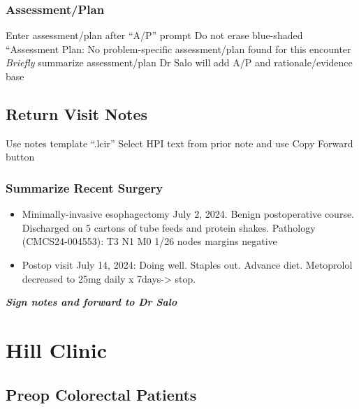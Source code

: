 \documentclass[
  letterpaper,
]{scrbook}
\providecommand{\tightlist}{%
  \setlength{\itemsep}{0pt}\setlength{\parskip}{0pt}}
\begin{document}
\subsection{Assessment/Plan}\label{assessmentplan}

Enter assessment/plan after ``A/P'' prompt Do not erase blue-shaded
``Assessment Plan: No problem-specific assessment/plan found for this
encounter \emph{Briefly} summarize assessment/plan Dr Salo will add A/P
and rationale/evidence base

\section{Return Visit Notes}\label{return-visit-notes}

Use notes template ``.lcir'' Select HPI text from prior note and use
Copy Forward button

\subsection{Summarize Recent Surgery}\label{summarize-recent-surgery}

\begin{itemize}
\tightlist
\item
  Minimally-invasive esophagectomy July 2, 2024. Benign postoperative
  course. Discharged on 5 cartons of tube feeds and protein shakes.
  Pathology (CMCS24-004553): T3 N1 M0 1/26 nodes margins negative
\item
  Postop visit July 14, 2024: Doing well. Staples out. Advance diet.
  Metoprolol decreased to 25mg daily x 7days-\textgreater{} stop.
\end{itemize}

\textbf{\emph{Sign notes and forward to Dr Salo}}

\section{}\label{section}

\chapter{Hill Clinic}\label{hill-clinic}

\section{Preop Colorectal Patients}\label{preop-colorectal-patients}
\end{document}

